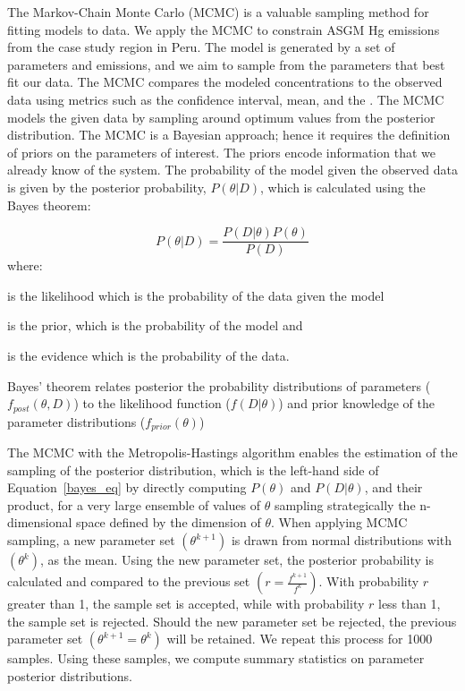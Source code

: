 \begin{flushleft}
The Markov-Chain Monte Carlo (MCMC) is a valuable sampling method for fitting models to data\cite{hogg_data_2018}. We apply the MCMC to constrain ASGM Hg emissions from the case study region in Peru.  The model is generated by a set of parameters and emissions, and we aim to sample from the parameters that best fit our data. The MCMC compares the modeled concentrations to the observed data using metrics such as the \nft confidence interval, mean, and the \iq. The MCMC models the given data by sampling around optimum values from the posterior distribution. The MCMC is a Bayesian approach; hence it requires the definition of priors on the parameters of interest. The priors encode information that we already know of the system. The probability of the model given the observed data is given by the posterior probability, $P(\theta|D)$, which is calculated using the Bayes theorem:

\begin{equation}
\label{bayes_eq}
P(\theta|D)=\frac{P(D|\theta)P(\theta)}{P(D)}
\end{equation}
where:
\end{flushleft}

\begin{description}[leftmargin=!,labelwidth={3 em}]
    \item [$P(D|\theta)$] is the likelihood which is the probability of the data given the model
    \item [$P(\theta)$] is the prior, which is the probability of the model and 
    \item [$P(D)$] is the evidence which is the probability of the data.
\end{description}

Bayes’ theorem relates posterior the probability distributions of parameters ($f_{post}(\theta, D)$) to the likelihood function ($f(D | \theta)$) and prior knowledge of the parameter distributions ($f_{prior}(\theta)$)

\begin{flushleft}
The MCMC with the Metropolis-Hastings algorithm enables the estimation of the sampling of the posterior distribution, which is the left-hand side of Equation~\ref{bayes_eq} by directly computing $P(\theta)$ and $P(D|\theta)$, and their product, for a very large ensemble of values of $\theta$ sampling strategically the n-dimensional space defined by the dimension of $\theta$\cite{brasseur_modeling_2017}. When applying MCMC sampling, a new parameter set $(\theta^{k+1})$ is drawn from normal distributions with $(\theta^{k})$, as the mean. Using the new parameter set, the posterior probability is calculated and compared to the previous set $(r = \frac{f^{k+1}}{f^k})$. With probability $r$ greater than 1, the sample set is accepted, while with probability $r$ less than 1, the sample set is rejected. Should the new parameter set be rejected, the previous parameter set $(\theta^{k+1}= \theta^k)$ will be retained. We repeat this process for 1000 samples. Using these samples, we compute summary statistics on parameter posterior distributions. 
\end{flushleft}

